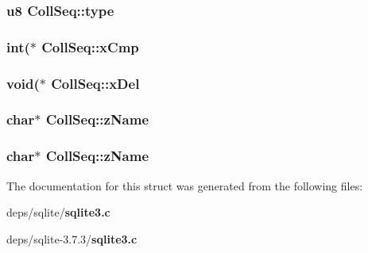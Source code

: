 \subsubsection{\setlength{\rightskip}{0pt plus 5cm}\bf{u8} \bf{Coll\-Seq::type}}\label{structCollSeq_0ef6d8c42c380105d37f13ce60f9a54b}


\subsubsection{\setlength{\rightskip}{0pt plus 5cm}int($\ast$ \bf{Coll\-Seq::x\-Cmp}}\label{structCollSeq_d54f081c391df7efac3d3e3d6b3a4a1b}


\subsubsection{\setlength{\rightskip}{0pt plus 5cm}void($\ast$ \bf{Coll\-Seq::x\-Del}}\label{structCollSeq_6e8fee7e929cd25f2929906111c097a1}


\subsubsection{\setlength{\rightskip}{0pt plus 5cm}char$\ast$ \bf{Coll\-Seq::z\-Name}}\label{structCollSeq_990ac91721f11d47ab199e32eef015af}


\subsubsection{\setlength{\rightskip}{0pt plus 5cm}char$\ast$ \bf{Coll\-Seq::z\-Name}}\label{structCollSeq_990ac91721f11d47ab199e32eef015af}




The documentation for this struct was generated from the following files:\begin{CompactItemize}
\item 
deps/sqlite/\bf{sqlite3.c}\item 
deps/sqlite-3.7.3/\bf{sqlite3.c}\end{CompactItemize}
